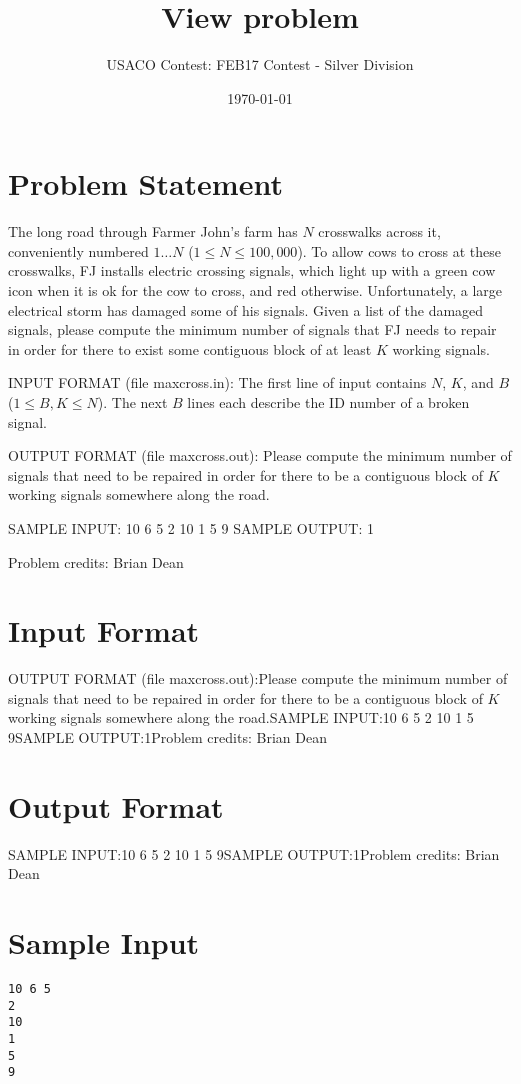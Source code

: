 \documentclass[12pt]{article}
\title{View problem}
\author{USACO Contest: FEB17 Contest - Silver Division}
\date{\today}
\begin{document}
\maketitle

\section*{Problem Statement}

The long road through Farmer John's farm has $N$ crosswalks across it,
conveniently numbered $1 \ldots N$ ($1 \leq N \leq 100,000$).   To allow cows to
cross at these crosswalks, FJ installs electric crossing signals, which light up
with a green cow icon when it is ok for the cow to cross, and red otherwise. 
Unfortunately, a large electrical storm has damaged some of his signals.  Given
a list of the damaged signals, please compute the minimum number of signals that
FJ needs to repair in order for there to exist some contiguous block of at least
$K$ working signals.

INPUT FORMAT (file maxcross.in):
The first line of input contains $N$, $K$, and $B$ ($1 \leq B, K \leq N$).  The
next $B$ lines each describe the ID number of a broken signal.

OUTPUT FORMAT (file maxcross.out):
Please compute the minimum number of signals that need to be repaired in order
for there to be a contiguous block of $K$ working signals somewhere along the
road.

SAMPLE INPUT:
10 6 5
2
10
1
5
9
SAMPLE OUTPUT: 
1


Problem credits: Brian Dean



\section*{Input Format}
OUTPUT FORMAT (file maxcross.out):Please compute the minimum number of signals that need to be repaired in order
for there to be a contiguous block of $K$ working signals somewhere along the
road.SAMPLE INPUT:10 6 5
2
10
1
5
9SAMPLE OUTPUT:1Problem credits: Brian Dean

\section*{Output Format}
SAMPLE INPUT:10 6 5
2
10
1
5
9SAMPLE OUTPUT:1Problem credits: Brian Dean

\section*{Sample Input}
\begin{verbatim}
10 6 5
2
10
1
5
9
\end{verbatim}
\end{document}
